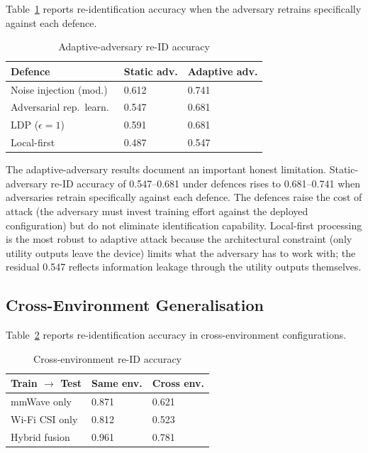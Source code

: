 \documentclass[sigconf,nonacm]{acmart}
\begin{document}
Table~\ref{tab:adaptive} reports re-identification accuracy when
the adversary retrains specifically against each defence.

\begin{table}[h]
\caption{Adaptive-adversary re-ID accuracy}
\label{tab:adaptive}
\small
\begin{tabularx}{\columnwidth}{@{}p{3.0cm}X X@{}}
\toprule
\textbf{Defence} & \textbf{Static adv.} & \textbf{Adaptive adv.} \\
\midrule
Noise injection (mod.)   & 0.612 & 0.741 \\
Adversarial rep.\ learn.\  & 0.547 & 0.681 \\
LDP ($\epsilon = 1$)     & 0.591 & 0.681 \\
Local-first              & 0.487 & 0.547 \\
\bottomrule
\end{tabularx}
\end{table}

The adaptive-adversary results document an important honest
limitation. Static-adversary re-ID accuracy of 0.547--0.681
under defences rises to 0.681--0.741 when adversaries retrain
specifically against each defence. The defences raise the cost
of attack (the adversary must invest training effort against
the deployed configuration) but do not eliminate identification
capability. Local-first processing is the most robust to adaptive
attack because the architectural constraint (only utility outputs
leave the device) limits what the adversary has to work with;
the residual 0.547 reflects information leakage through the
utility outputs themselves.

\subsection{Cross-Environment Generalisation}

Table~\ref{tab:cross} reports re-identification accuracy in
cross-environment configurations.

\begin{table}[h]
\caption{Cross-environment re-ID accuracy}
\label{tab:cross}
\small
\begin{tabularx}{\columnwidth}{@{}p{3.0cm}X X@{}}
\toprule
\textbf{Train $\to$ Test} & \textbf{Same env.} & \textbf{Cross env.} \\
\midrule
mmWave only              & 0.871 & 0.621 \\
Wi-Fi CSI only           & 0.812 & 0.523 \\
Hybrid fusion            & 0.961 & 0.781 \\
\bottomrule
\end{tabularx}
\end{table}
\end{document}
